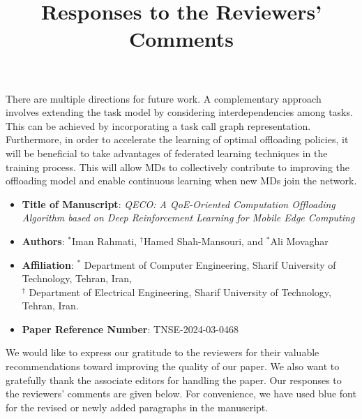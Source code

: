 \documentclass[12pt,draftclsnofoot,onecolumn]{IEEEtran}
\begin{document}
There are multiple directions for future work. A complementary approach involves extending the task model by considering interdependencies among tasks. This can be achieved by incorporating a task call graph representation. Furthermore, in order to accelerate the learning of optimal offloading policies, it will be beneficial to take advantages of federated learning techniques in the training process. This will allow MDs to collectively contribute to improving the offloading model and enable continuous learning when new MDs join the network.





\newpage





\title{Responses to the Reviewers' Comments}

\maketitle

\vspace{-1.5cm}

\setcounter{page}{1}

\begin{itemize}
	\item \textbf{Title of Manuscript}: \textit{QECO: A QoE-Oriented Computation Offloading Algorithm based on Deep Reinforcement Learning for Mobile Edge Computing}


	
	
	\item \textbf{Authors}:  $^\ast$Iman Rahmati, $^\dagger$Hamed Shah-Mansouri, and $^\ast$Ali Movaghar
	
	
	\item \textbf{Affiliation}: $^\ast$ Department of Computer Engineering,  Sharif University of Technology, Tehran, Iran, \\ $^\dagger$ Department of Electrical Engineering, Sharif University of Technology, Tehran, Iran.
	
	\item \textbf{Paper Reference Number}: TNSE-2024-03-0468 
	
\end{itemize}

\vspace{0.3cm}


\noindent We would like to express our gratitude to the reviewers for their valuable recommendations toward improving the quality of our paper. We also want to gratefully thank the associate editors for handling the paper. Our responses to the reviewers' comments are given below. For convenience, we have used blue font for the revised or newly added paragraphs in the manuscript.\newline
\end{document}
